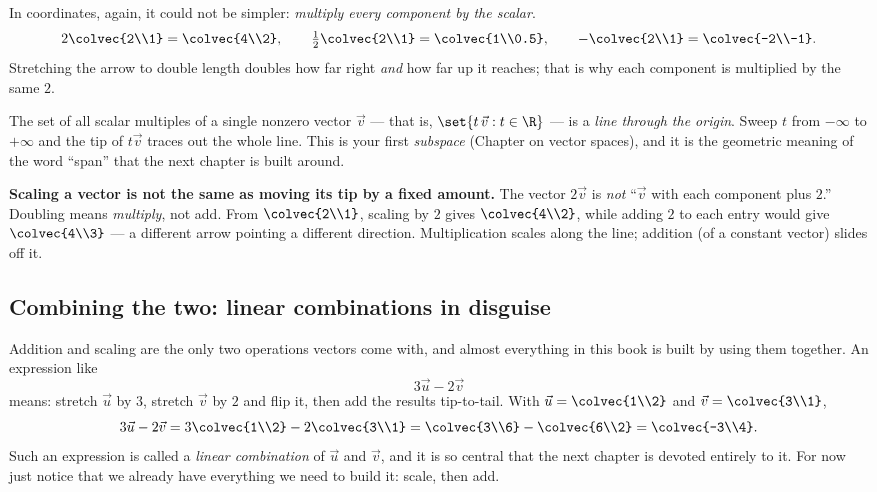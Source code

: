 In coordinates, again, it could not be simpler: \emph{multiply every component by the
scalar}.
\[
  2\colvec{2\\1}=\colvec{4\\2},\qquad
  \tfrac12\colvec{2\\1}=\colvec{1\\0.5},\qquad
  -\colvec{2\\1}=\colvec{-2\\-1}.
\]
Stretching the arrow to double length doubles how far right \emph{and} how far up it
reaches; that is why each component is multiplied by the same $2$.

\begin{focusbox}
The set of all scalar multiples of a single nonzero vector $\vec{v}$ --- that is,
$\set{t\,\vec{v} : t \in \R}$ --- is a \emph{line through the origin}. Sweep $t$ from
$-\infty$ to $+\infty$ and the tip of $t\vec{v}$ traces out the whole line. This is your
first \emph{subspace} (Chapter on vector spaces), and it is the geometric meaning of the
word ``span'' that the next chapter is built around.
\end{focusbox}

\begin{trapbox}
\textbf{Scaling a vector is not the same as moving its tip by a fixed amount.} The vector
$2\vec{v}$ is \emph{not} ``$\vec{v}$ with each component plus $2$.'' Doubling means
\emph{multiply}, not add. From $\colvec{2\\1}$, scaling by $2$ gives $\colvec{4\\2}$,
while adding $2$ to each entry would give $\colvec{4\\3}$ --- a different arrow pointing a
different direction. Multiplication scales along the line; addition (of a constant vector)
slides off it.
\end{trapbox}

\subsection*{Combining the two: linear combinations in disguise}

Addition and scaling are the only two operations vectors come with, and almost everything
in this book is built by using them together. An expression like
\[
  3\vec{u} - 2\vec{v}
\]
means: stretch $\vec{u}$ by $3$, stretch $\vec{v}$ by $2$ and flip it, then add the
results tip-to-tail. With $\vec{u}=\colvec{1\\2}$ and $\vec{v}=\colvec{3\\1}$,
\[
  3\vec{u}-2\vec{v}
  = 3\colvec{1\\2} - 2\colvec{3\\1}
  = \colvec{3\\6} - \colvec{6\\2}
  = \colvec{-3\\4}.
\]
Such an expression is called a \emph{linear combination} of $\vec{u}$ and $\vec{v}$, and
it is so central that the next chapter is devoted entirely to it. For now just notice that
we already have everything we need to build it: scale, then add.

